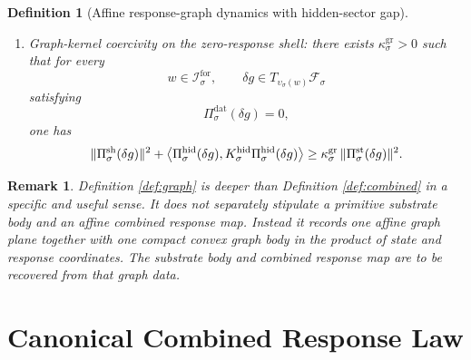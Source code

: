 \documentclass[11pt]{article}
\newcommand{\ForSpace}[1]{\mathcal I_{#1}^{\mathrm{for}}}
\newcommand{\HiddenOperator}[1]{K_{#1}^{\mathrm{hid}}}
\newcommand{\GraphAffine}[1]{\mathcal F_{#1}}
\newcommand{\GraphBody}[1]{Q_{#1}}
\newcommand{\StateProj}[1]{\Pi_{#1}^{\mathrm{st}}}
\newcommand{\GraphDataProj}[1]{\Pi_{#1}^{\mathrm{dat}}}
\newcommand{\GraphShellProj}[1]{\Pi_{#1}^{\mathrm{sh}}}
\newcommand{\GraphHiddenProj}[1]{\Pi_{#1}^{\mathrm{hid}}}
\newcommand{\GraphEmbed}[1]{\upsilon_{#1}}
\newtheorem{definition}{Definition}
\newtheorem{remark}{Remark}
\begin{document}
\begin{definition}[Affine response-graph dynamics with hidden-sector gap]
\begin{enumerate}
\begin{equation}
    =
    \GraphDataProj{\sigma}
    \Bigl(
    \GraphBody{\sigma}\cap
    \bigl(\GraphShellProj{\sigma}\bigr)^{-1}(0)\cap
    \bigl(\GraphHiddenProj{\sigma}\bigr)^{-1}(0)
    \Bigr).
    \label{eq:graphsolvability}
    \end{equation}
    \item Graph-kernel coercivity on the zero-response shell: there exists \(\kappa_{\sigma}^{\mathrm{gr}}>0\) such that for every
    \[
    w\in\ForSpace{\sigma},
    \qquad
    \delta g\in T_{\GraphEmbed{\sigma}(w)}\GraphAffine{\sigma}
    \]
    satisfying
    \[
    \GraphDataProj{\sigma}(\delta g)=0,
    \]
    one has
    \begin{equation}
    \|\GraphShellProj{\sigma}(\delta g)\|^{2}
    +
    \ev{
    \GraphHiddenProj{\sigma}(\delta g),
    \HiddenOperator{\sigma}\GraphHiddenProj{\sigma}(\delta g)
    }
    \ge
    \kappa_{\sigma}^{\mathrm{gr}}\,
    \|\StateProj{\sigma}(\delta g)\|^{2}.
    \label{eq:graphcoercive}
    \end{equation}
\end{enumerate}
\end{definition}

\begin{remark}
Definition \ref{def:graph} is deeper than Definition \ref{def:combined} in a specific and useful sense. It does not separately stipulate a primitive substrate body and an affine combined response map. Instead it records one affine graph plane together with one compact convex graph body in the product of state and response coordinates. The substrate body and combined response map are to be recovered from that graph data.
\end{remark}

\section{Canonical Combined Response Law}
\end{document}
